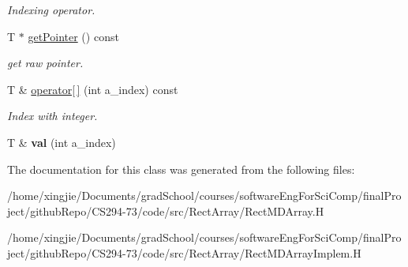 \begin{DoxyCompactItemize}
\begin{DoxyCompactList}\small\item\em Indexing operator. \end{DoxyCompactList}\item 
\hypertarget{classRectMDArray_aade82e1d2165ca7382f04a30f898e749}{}T $\ast$ \hyperlink{classRectMDArray_aade82e1d2165ca7382f04a30f898e749}{get\+Pointer} () const \label{classRectMDArray_aade82e1d2165ca7382f04a30f898e749}

\begin{DoxyCompactList}\small\item\em get raw pointer. \end{DoxyCompactList}\item 
\hypertarget{classRectMDArray_a65d54efccaa796e05375cb0f9a477a36}{}T \& \hyperlink{classRectMDArray_a65d54efccaa796e05375cb0f9a477a36}{operator\mbox{[}$\,$\mbox{]}} (int a\+\_\+index) const \label{classRectMDArray_a65d54efccaa796e05375cb0f9a477a36}

\begin{DoxyCompactList}\small\item\em Index with integer. \end{DoxyCompactList}\item 
\hypertarget{classRectMDArray_a519144a95692a9e6aabadbd80e8da4b9}{}T \& {\bfseries val} (int a\+\_\+index)\label{classRectMDArray_a519144a95692a9e6aabadbd80e8da4b9}

\end{DoxyCompactItemize}


The documentation for this class was generated from the following files\+:\begin{DoxyCompactItemize}
\item 
/home/xingjie/\+Documents/grad\+School/courses/software\+Eng\+For\+Sci\+Comp/final\+Project/github\+Repo/\+C\+S294-\/73/code/src/\+Rect\+Array/Rect\+M\+D\+Array.\+H\item 
/home/xingjie/\+Documents/grad\+School/courses/software\+Eng\+For\+Sci\+Comp/final\+Project/github\+Repo/\+C\+S294-\/73/code/src/\+Rect\+Array/Rect\+M\+D\+Array\+Implem.\+H\end{DoxyCompactItemize}
